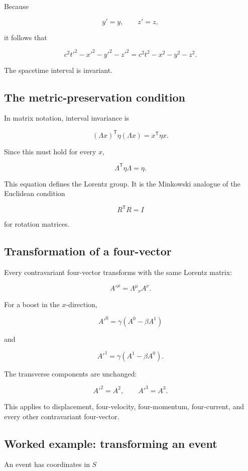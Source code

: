Because

\[
y'=y,
\qquad
z'=z,
\]

it follows that

\[
\boxed{
c^{2}t'^{2}-x'^{2}-y'^{2}-z'^{2}
=
c^{2}t^{2}-x^{2}-y^{2}-z^{2}
}.
\]

The spacetime interval is invariant.

\subsection{The metric-preservation condition}

In matrix notation, interval invariance is

\[
(\Lambda x)^{\mathsf{T}}
\eta
(\Lambda x)
=
x^{\mathsf{T}}\eta x.
\]

Since this must hold for every \(x\),

\[
\boxed{
\Lambda^{\mathsf{T}}\eta\Lambda
=
\eta
}.
\]

This equation defines the Lorentz group. It is the Minkowski analogue of the Euclidean condition

\[
R^{\mathsf{T}}R=I
\]

for rotation matrices.

\subsection{Transformation of a four-vector}

Every contravariant four-vector transforms with the same Lorentz matrix:

\[
A'^{\mu}
=
\Lambda^{\mu}{}_{\nu}A^{\nu}.
\]

For a boost in the \(x\)-direction,

\[
\boxed{
A'^{0}
=
\gamma(A^{0}-\beta A^{1})
}
\]

and

\[
\boxed{
A'^{1}
=
\gamma(A^{1}-\beta A^{0})
}.
\]

The transverse components are unchanged:

\[
A'^{2}=A^{2},
\qquad
A'^{3}=A^{3}.
\]

This applies to displacement, four-velocity, four-momentum, four-current, and every other contravariant four-vector.

\subsection{Worked example: transforming an event}

An event has coordinates in \(S\)

